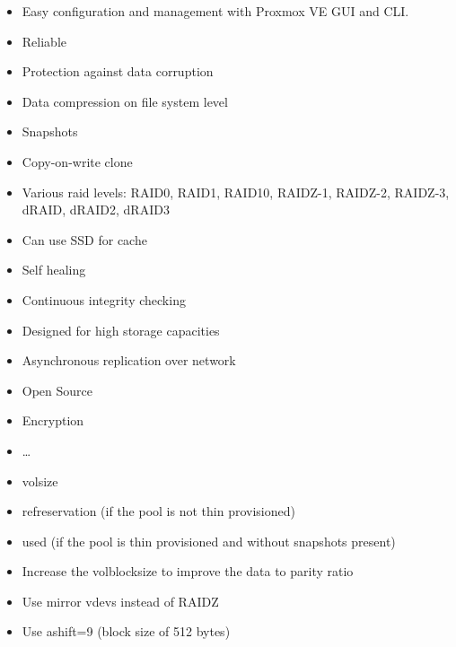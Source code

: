 \begin{itemize}[leftmargin=2cm]

	\item Easy configuration and management with Proxmox VE GUI and CLI.

	\item Reliable

	\item Protection against data corruption

	\item Data compression on file system level

	\item Snapshots

	\item Copy-on-write clone

	\item Various raid levels: RAID0, RAID1, RAID10, RAIDZ-1, RAIDZ-2, RAIDZ-3, dRAID, dRAID2, dRAID3

	\item Can use SSD for cache

	\item Self healing

	\item Continuous integrity checking

	\item Designed for high storage capacities

	\item Asynchronous replication over network

	\item Open Source

	\item Encryption

	\item …

\end{itemize}

\begin{itemize}[leftmargin=2cm]

	\item volsize

	\item refreservation (if the pool is not thin provisioned)

	\item used (if the pool is thin provisioned and without snapshots present)

\end{itemize}

\begin{itemize}[leftmargin=2cm]

	\item Increase the volblocksize to improve the data to parity ratio

	\item Use mirror vdevs instead of RAIDZ

	\item Use ashift=9 (block size of 512 bytes)

\end{itemize}

